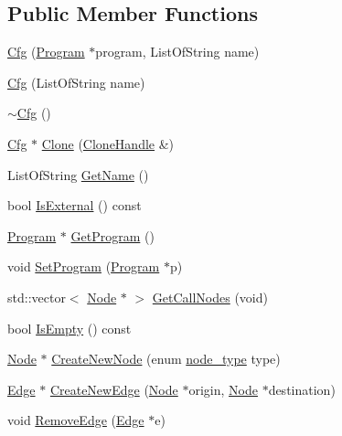 \subsection*{Public Member Functions}
\begin{DoxyCompactItemize}
\item 
\hyperlink{classcfglib_1_1Cfg_a0100bef586e13e2ad53c83b20e365c5e}{Cfg} (\hyperlink{classcfglib_1_1Program}{Program} $\ast$program, List\+Of\+String name)
\item 
\hyperlink{classcfglib_1_1Cfg_a3c7102871bcac1c06389aa38674c76b1}{Cfg} (List\+Of\+String name)
\item 
\hyperlink{classcfglib_1_1Cfg_a279b0b9b7f73a621bc50b35cf7fb7dda}{$\sim$\+Cfg} ()
\item 
\hyperlink{classcfglib_1_1Cfg}{Cfg} $\ast$ \hyperlink{classcfglib_1_1Cfg_a87e8932c31bd9747af7eafc92b6d749b}{Clone} (\hyperlink{classcfglib_1_1CloneHandle}{Clone\+Handle} \&)
\item 
List\+Of\+String \hyperlink{classcfglib_1_1Cfg_a429688de55701afc5e5e41a6cfcae050}{Get\+Name} ()
\item 
bool \hyperlink{classcfglib_1_1Cfg_a53c796e515ba5bdad1dd17b5e2cea403}{Is\+External} () const
\item 
\hyperlink{classcfglib_1_1Program}{Program} $\ast$ \hyperlink{classcfglib_1_1Cfg_aefc6931e39418420ae47e09528bba5af}{Get\+Program} ()
\item 
void \hyperlink{classcfglib_1_1Cfg_a6408b372beac5ab2eaa02dbea18ca23c}{Set\+Program} (\hyperlink{classcfglib_1_1Program}{Program} $\ast$p)
\item 
std\+::vector$<$ \hyperlink{classcfglib_1_1Node}{Node} $\ast$ $>$ \hyperlink{classcfglib_1_1Cfg_a54ab52821050574fa12eca0eb87f7271}{Get\+Call\+Nodes} (void)
\item 
bool \hyperlink{classcfglib_1_1Cfg_a09c2fff20ceddf2a659bbc8e64559f8e}{Is\+Empty} () const
\item 
\hyperlink{classcfglib_1_1Node}{Node} $\ast$ \hyperlink{classcfglib_1_1Cfg_a023e8fe06cf55bfecf3c1f4a3ddb3f99}{Create\+New\+Node} (enum \hyperlink{namespacecfglib_a44952a45d827aaa271f7e7dac5bf7752}{node\+\_\+type} type)
\item 
\hyperlink{classcfglib_1_1Edge}{Edge} $\ast$ \hyperlink{classcfglib_1_1Cfg_aa3e584ba98c948fe9cb31cbd9ba30215}{Create\+New\+Edge} (\hyperlink{classcfglib_1_1Node}{Node} $\ast$origin, \hyperlink{classcfglib_1_1Node}{Node} $\ast$destination)
\item 
void \hyperlink{classcfglib_1_1Cfg_a4150c4a82a82d63ab855595c844148f2}{Remove\+Edge} (\hyperlink{classcfglib_1_1Edge}{Edge} $\ast$e)

\end{DoxyCompactItemize}
